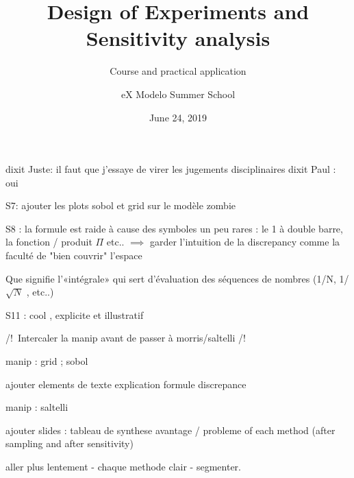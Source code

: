 \documentclass{../beamer_template/myBeamer}
\title[DOE/Sensitivity Analysis]{Design of Experiments and Sensitivity analysis}
\subtitle{Course and practical application}
\author{eX Modelo Summer School}
\date{June 24, 2019}
\institute{\texttt{[image: ../beamer\_template/figures/logos/openmole.png]}}
\begin{document}
\begin{frame}[plain]
	\titlepage
\end{frame}
\addtocounter{framenumber}{-1}











dixit Juste: il faut que j'essaye de virer les jugements disciplinaires
dixit Paul : oui 

S7: ajouter les plots sobol et grid sur le modèle zombie

S8 : la formule est raide à cause des symboles un peu rares : le 1 à double barre, la fonction / produit $\Pi$ etc.. $\implies$ garder l'intuition de la discrepancy comme la faculté de "bien couvrir" l'espace



Que signifie l'«intégrale» qui sert d'évaluation des séquences de nombres (1/N, 1/ $\sqrt N$ , etc..)

S11 : cool , explicite et illustratif


/!\ Intercaler la manip avant de passer à morris/saltelli /!\

manip : grid ; sobol

ajouter elements de texte explication formule discrepance

manip : saltelli

ajouter slides : tableau de synthese avantage / probleme of each method (after sampling and after sensitivity)

aller plus lentement - chaque methode clair - segmenter.



\end{document}
